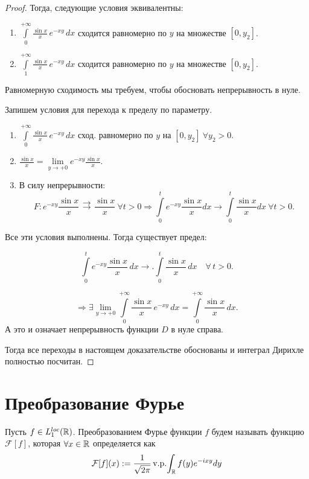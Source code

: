 \begin{proof}
\noindent Тогда, следующие условия эквивалентны: 

\begin{enumerate}
    \item \(\int\limits_0^{+\infty} \frac{\sin x}{x} \, e^{-x y} \, dx \) сходится равномерно по \( y \) на множестве \( [0, y_2] \).
    
    \item \(\int\limits_1^{+\infty} \frac{\sin x}{x} \, e^{-x y} \, dx \) сходится равномерно по \( y \) на множестве \( [0, y_2] \).
\end{enumerate}

\noindent Равномерную сходимость мы требуем, чтобы обосновать непрерывность в нуле. 

\noindent Запишем условия для перехода к пределу по параметру. 

\begin{enumerate}
    \item $\int\limits_0^{+\infty} \frac{\sin x}{x} \, e^{-x y} \, dx$ сход. равномерно по $y$ на $[0, y_2 ] \ \forall y_2 > 0.$

    \item $\frac{\sin x}{x} = \lim\limits_{y \to +0} e^{-x y} \frac{\sin x}{x}.$


    \item В силу непрерывности: 
    $$
    F: e^{-x y} \frac{\sin x}{x} \mathrel{\substack{\rightrightarrows \\ [0, t]}} \dfrac{\sin x}{x}  \ \forall t > 0 \Rightarrow \int\limits_{0}^{t} e^{-xy} \dfrac{\sin x}{x} dx \rightarrow \int\limits_{0}^{t} \dfrac{\sin x}{x} dx \ \forall t > 0.
    $$
    
\end{enumerate}

\noindent Все эти условия выполнены. Тогда существует предел: 

\[
\int\limits_0^{t} e^{-x y} \frac{\sin x}{x} \, dx 
\longrightarrow.
\int\limits_0^{t} \frac{\sin x}{x} \, dx \quad \forall\, t > 0.
\]


\[
\Rightarrow \exists \lim_{y \to +0} \int\limits_0^{+\infty} \frac{\sin x}{x} \, e^{-x y} \, dx 
= \int\limits_0^{+\infty} \frac{\sin x}{x} \, dx.
\]
А это и означает непрерывность функции $D$ в нуле справа.

\noindent Тогда  все переходы в настоящем доказательстве обоснованы и интеграл Дирихле полностью посчитан. 

\end{proof}


\section{Преобразование Фурье}
\begin{definition}
Пусть $f \in L_1^{loc}(\mathbb{R})$.
Преобразованием Фурье функции $f$ будем называть функцию $\mathcal{F}[f]$, которая $\forall x \in \mathbb{R}$ определяется как
\[
    \mathcal{F}[f](x) := \dfrac{1}{\sqrt {2\pi}}\mathop{\mathrm{v.p.}}\!\int_{\mathbb{R}} f(y)e^{-ixy}dy
\]
\end{definition}

